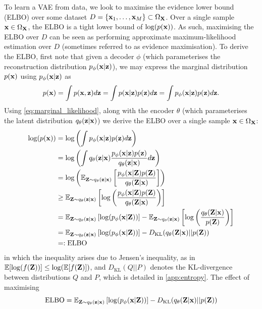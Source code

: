 \documentclass[11pt]{article}
\begin{document}
To learn a VAE from data, we look to maximise the evidence lower bound (ELBO) over some dataset $D=\{\mathbf{x}_1,\dots,\mathbf{x}_M\}\subset\Omega_{\mathbf{X}}$. Over a single sample $\mathbf{x}\in\Omega_{\mathbf{X}}$, the ELBO is a tight lower bound of $\log(p(\mathbf{x}))$. As such, maximising the ELBO over $D$ can be seen as performing approximate maximum-likelihood estimation over $D$ (sometimes referred to as evidence maximisation). To derive the ELBO, first note that given a decoder $\phi$ (which parameterises the reconstruction distribution $p_{\phi}(\mathbf{x}|\mathbf{z})$), we may express the marginal distribution $p(\mathbf{x})$ using $p_{\phi}(\mathbf{x}|\mathbf{z})$ as
\begin{equation}
\label{eq:marginal_likelihood}
p(\mathbf{x})
=
\int p(\mathbf{x},\mathbf{z})d\mathbf{z}
=
\int p(\mathbf{x}|\mathbf{z})p(\mathbf{z})d\mathbf{z}
=
\int p_{\phi}(\mathbf{x}|\mathbf{z})p(\mathbf{z})d\mathbf{z}.
\end{equation}
Using \autoref{eq:marginal_likelihood}, along with the encoder $\theta$ (which parameterises the latent distribution $q_{\theta}(\mathbf{z}|\mathbf{x})$) we derive the ELBO over a single sample $\mathbf{x}\in\Omega_{\mathbf{X}}$:
\begin{align*}
    \log(p(\mathbf{x}))
    &=
    \log\left(\int p_{\phi}(\mathbf{x}|\mathbf{z})p(\mathbf{z})d\mathbf{z}\right)\\
    &=
    \log\left(\int q_{\theta}(\mathbf{z}|\mathbf{x})\frac{p_{\phi}(\mathbf{x}|\mathbf{z})p(\mathbf{z})}{q_{\theta}(\mathbf{z}|\mathbf{x})}d\mathbf{z}\right)\\
    &=
    \log\left(\mathbb{E}_{\mathbf{Z}\sim q_{\theta}(\mathbf{z}|\mathbf{x})}\left[\frac{p_{\phi}(\mathbf{x}|\mathbf{Z})p(\mathbf{Z})}{q_{\theta}(\mathbf{Z}|\mathbf{x})}\right]\right)\\
    &\geq
    \mathbb{E}_{\mathbf{Z}\sim q_{\theta}(\mathbf{z}|\mathbf{x})}\left[\log\left(\frac{p_{\phi}(\mathbf{x}|\mathbf{Z})p(\mathbf{Z})}{q_{\theta}(\mathbf{Z}|\mathbf{x})}\right)\right]\\
    &=
    \mathbb{E}_{\mathbf{Z}\sim q_{\theta}(\mathbf{z}|\mathbf{x})}\left[\log(p_{\phi}(\mathbf{x}|\mathbf{Z}))\right]-\mathbb{E}_{\mathbf{Z}\sim q_{\theta}(\mathbf{z}|\mathbf{x})}\left[\log\left(\frac{q_{\theta}(\mathbf{Z}|\mathbf{x})}{p(\mathbf{Z})}\right)\right]\\
    &=
    \mathbb{E}_{\mathbf{Z}\sim q_{\theta}(\mathbf{z}|\mathbf{x})}\left[\log(p_{\phi}(\mathbf{x}|\mathbf{Z}))\right]-D_{\text{KL}}(q_{\theta}(\mathbf{Z}|\mathbf{x})||p(\mathbf{Z}))\\
    &=:
    \text{ELBO}
\end{align*}
in which the inequality arises due to Jensen's inequality, as in $\mathbb{E}[\log(f(\mathbf{Z}))]\leq\log(\mathbb{E}[f(\mathbf{Z})])$, and $D_\text{KL}(Q||P)$ denotes the KL-divergence between distributions $Q$ and $P$, which is detailed in \autoref{app:entropy}. The effect of maximising
$$
\text{ELBO}
=
\mathbb{E}_{\mathbf{Z}\sim q_{\theta}(\mathbf{z}|\mathbf{x})}\left[\log(p_{\phi}(\mathbf{x}|\mathbf{Z}))\right]-D_{\text{KL}}(q_{\theta}(\mathbf{Z}|\mathbf{x})||p(\mathbf{Z}))
$$
\end{document}
